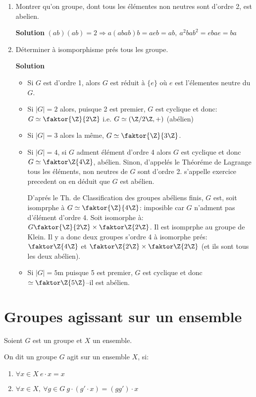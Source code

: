 \begin{examplebox}
	\begin{enumerate}
		\item Montrer qu'on groupe, dont tous les élémentes non neutres sont d'ordre 2, est abelien.
		
		\textbf{Solution} $(ab)(ab)=2 \Rightarrow a(abab)b=aeb=ab,\ a^2bab^2=ebae=ba$
		\item Déterminer à isomporphisme prés tous les groupe.
		
		\textbf{Solution} 
		\begin{itemize}
			\item Si $G$ est d'ordre 1, alors $G$ est réduit à $\{e\}$ où $e$ est l'élementes neutre du $G$.
			\item Si $|G|=2$ alors, puisque 2 est premier, $G$ est cyclique et donc: $G\simeq \faktor{\Z}{2\Z}$ i.e. $G\simeq (\Z/2\Z, +)$ (abélien)
			\item Si $|G|=3$ alors la même, $G\simeq \faktor{\Z}{3\Z}$.
			\item Si $|G|=4$, si $G$ adment élément d'ordre 4 alors $G$ est cyclique et donc $G\simeq \faktor\Z{4\Z}$, abélien. Sinon, d'appelés le Théoréme de Lagrange tous les éléments, non neutres de $G$ sont d'ordre 2. s'appelle exercice precedent on en déduit que $G$ est abélien.
			
			D'aprés le Th. de Classification des groupes abéliens finis, $G$ est, soit isomprphe à $G\simeq \faktor{\Z}{4\Z}$: imposible car $G$ n'adment pas d'élément d'ordre 4. Soit isomorphe à: $G\faktor{\Z}{2\Z}\times \faktor\Z{2\Z}$. Il est isomprphe au groupe de Klein. Il y a donc deux groupes s'ordre 4 à isomorphe prés: $\faktor\Z{4\Z}$ et $\faktor\Z{2\Z}\times\faktor\Z{2\Z}$ (et ils sont tous les deux abélien).
			\item Si $|G|=5$m puisque 5 est premier, $G$ est cyclique et donc $\simeq \faktor\Z{5\Z}$--il est abélien.
		\end{itemize}
	\end{enumerate}
\end{examplebox}

\section{Groupes agissant sur un ensemble} %

Soient $G$ est un groupe et $X$ un ensemble.
\begin{definition}
	On dit un groupe $G$ agit sur un ensemble $X$, si:
	\begin{enumerate}
		\item $\forall x\in X\ e\cdot x= x$
		\item $\forall x\in X,\ \forall g\in G\ g\cdot(g'\cdot x)=(gg')\cdot x$
	\end{enumerate}
\end{definition}

